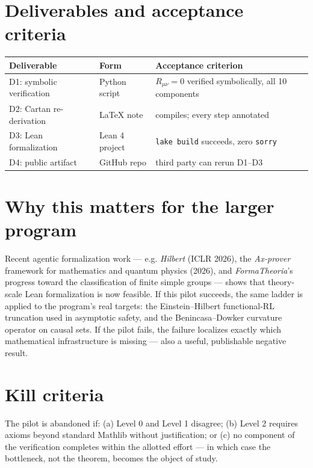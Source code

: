\documentclass[11pt]{article}
\begin{document}
\section{Deliverables and acceptance criteria}
\begin{center}
\begin{tabular}{@{}lll@{}}
\toprule
Deliverable & Form & Acceptance criterion \\
\midrule
D1: symbolic verification & Python script & $R_{\mu\nu}=0$ verified symbolically, all 10 components \\
D2: Cartan re-derivation & LaTeX note & compiles; every step annotated \\
D3: Lean formalization & Lean 4 project & \texttt{lake build} succeeds, zero \texttt{sorry} \\
D4: public artifact & GitHub repo & third party can rerun D1--D3 \\
\bottomrule
\end{tabular}
\end{center}

\section{Why this matters for the larger program}
Recent agentic formalization work --- e.g. \emph{Hilbert} (ICLR 2026), the
\emph{Ax-prover} framework for mathematics and quantum physics (2026), and
\emph{FormaTheoria}'s progress toward the classification of finite simple groups ---
shows that theory-scale Lean formalization is now feasible. If this pilot succeeds,
the same ladder is applied to the program's real targets: the Einstein--Hilbert
functional-RL truncation used in asymptotic safety, and the Benincasa--Dowker curvature
operator on causal sets. If the pilot fails, the failure localizes exactly which
mathematical infrastructure is missing --- also a useful, publishable negative result.

\section{Kill criteria}
The pilot is abandoned if: (a) Level 0 and Level 1 disagree; (b) Level 2 requires
axioms beyond standard Mathlib without justification; or (c) no component of the
verification completes within the allotted effort --- in which case the bottleneck,
not the theorem, becomes the object of study.
\end{document}
